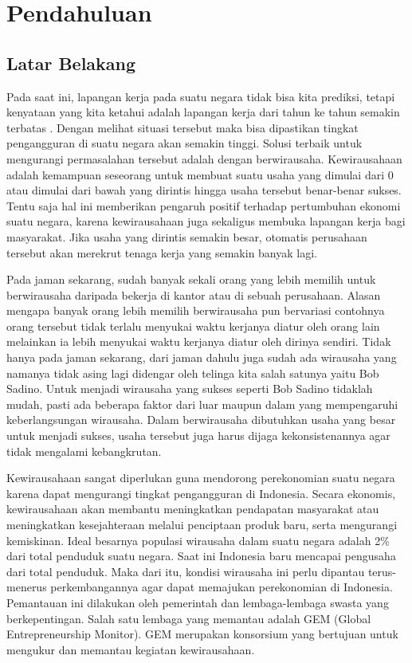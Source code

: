\chapter{Pendahuluan}
\label{chap:intro}
   
\section{Latar Belakang}
\label{sec:label}

Pada saat ini, lapangan kerja pada suatu negara tidak bisa kita prediksi, tetapi kenyataan yang kita ketahui adalah lapangan kerja dari tahun ke tahun semakin terbatas \cite{LBwirausaha}. Dengan melihat situasi tersebut maka bisa dipastikan tingkat pengangguran di suatu negara akan semakin tinggi. Solusi terbaik untuk mengurangi permasalahan tersebut adalah dengan berwirausaha. Kewirausahaan adalah kemampuan seseorang untuk membuat suatu usaha yang dimulai dari 0 atau dimulai dari bawah yang dirintis hingga usaha tersebut benar-benar sukses. Tentu saja hal ini memberikan pengaruh positif terhadap pertumbuhan ekonomi suatu negara, karena kewirausahaan juga sekaligus membuka lapangan kerja bagi masyarakat. Jika usaha yang dirintis semakin besar, otomatis perusahaan tersebut akan merekrut tenaga kerja yang semakin banyak lagi. 

 
Pada jaman sekarang, sudah banyak sekali orang yang lebih memilih untuk berwirausaha daripada bekerja di kantor atau di sebuah perusahaan. Alasan mengapa banyak orang lebih memilih berwirausaha pun bervariasi contohnya orang tersebut tidak terlalu menyukai waktu kerjanya diatur oleh orang lain melainkan ia lebih menyukai waktu kerjanya diatur oleh dirinya sendiri. Tidak hanya pada jaman sekarang, dari jaman dahulu juga sudah ada wirausaha yang namanya tidak asing lagi didengar oleh telinga kita salah satunya yaitu Bob Sadino. Untuk menjadi wirausaha yang sukses seperti Bob Sadino tidaklah mudah, pasti ada beberapa faktor dari luar maupun dalam yang mempengaruhi keberlangsungan wirausaha. Dalam berwirausaha dibutuhkan usaha yang besar untuk menjadi sukses, usaha tersebut juga harus dijaga kekonsistenannya agar tidak mengalami kebangkrutan.


Kewirausahaan sangat diperlukan guna mendorong perekonomian suatu negara karena dapat mengurangi tingkat pengangguran di Indonesia. Secara ekonomis, kewirausahaan akan membantu meningkatkan pendapatan masyarakat atau meningkatkan kesejahteraan melalui penciptaan produk baru, serta mengurangi kemiskinan.  Ideal besarnya populasi wirausaha dalam suatu negara adalah 2\% dari total penduduk suatu negara. Saat ini Indonesia baru mencapai pengusaha dari total penduduk. Maka dari itu, kondisi wirausaha ini perlu dipantau terus-menerus perkembangannya agar dapat memajukan perekonomian di Indonesia. Pemantauan ini dilakukan oleh pemerintah dan lembaga-lembaga swasta yang berkepentingan. Salah satu lembaga yang memantau adalah GEM (Global Entrepreneurship Monitor). GEM merupakan konsorsium yang bertujuan untuk mengukur dan memantau kegiatan kewirausahaan. 


